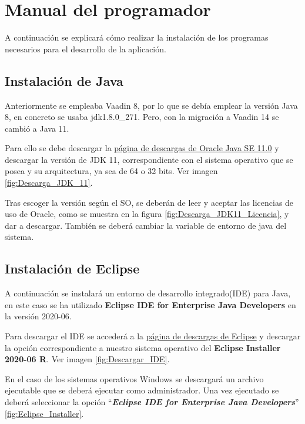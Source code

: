 \section{Manual del programador}
A continuación se explicará cómo realizar la instalación de los programas necesarios para el desarrollo de la aplicación.

\subsection{Instalación de Java}

Anteriormente se empleaba Vaadin 8, por lo que se debía emplear la versión Java 8, en concreto se usaba jdk1.8.0\_271. Pero, con la migración a Vaadin 14 se cambió a Java 11.
 
Para ello se debe descargar la \href{https://www.oracle.com/es/java/technologies/javase/jdk11-archive-downloads.html}{página de descargas de Oracle Java SE 11.0} y descargar la versión de JDK 11, correspondiente con el sistema operativo que se posea y su arquitectura, ya sea de 64 o 32 bits. Ver imagen \ref{fig:Descarga_JDK_11}.

Tras escoger la versión según el SO, se deberán de leer y aceptar las licencias de uso de Oracle, como se muestra en la figura \ref{fig:Descarga_JDK11_Licencia}, y dar a descargar. También se deberá cambiar la variable de entorno de java del sistema.


\subsection{Instalación de Eclipse}
A continuación se instalará un entorno de desarrollo integrado(IDE) para Java, en este caso se ha utilizado \textbf{Eclipse IDE for Enterprise Java Developers} en la versión 2020-06. 

Para descargar el IDE se accederá a la \href{https://www.eclipse.org/downloads/packages/release/2020-06/r}{página de descargas de Eclipse} y descargar la opción correspondiente a nuestro sistema operativo del \textbf{Eclipse Installer 2020-06 R}. Ver imagen \ref{fig:Descargar_IDE}.


En el caso de los sistemas operativos Windows se descargará un archivo ejecutable que se deberá ejecutar como administrador. Una vez ejecutado se deberá seleccionar la opción ``\textbf{\textit{Eclipse IDE for Enterprise Java Developers}}'' \ref{fig:Eclipse_Installer}. 


